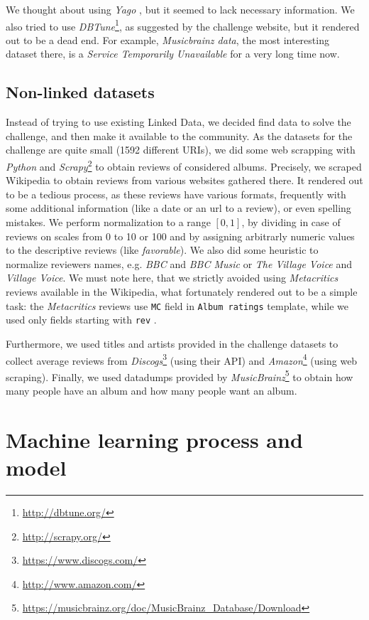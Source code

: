\documentclass{llncs}
\begin{document}
We thought about using \emph{Yago} \cite{yago}, but it seemed to lack necessary information.
We also tried to use \emph{DBTune}\footnote{\url{http://dbtune.org/}}, as suggested by the challenge website, but it rendered out to be a dead end.
For example, \emph{Musicbrainz data}, the most interesting dataset there, is a \emph{Service Temporarily Unavailable} for a very long time now.

\subsection{Non-linked datasets\label{sec:nonld}}
Instead of trying to use existing Linked Data, we decided find data to solve the challenge, and then make it available to the community.
As the datasets for the challenge are quite small (1592 different URIs), we did some web scrapping with \emph{Python} and \emph{Scrapy}\footnote{\url{http://scrapy.org/}} to obtain reviews of considered albums.
Precisely, we scraped Wikipedia to obtain reviews from various websites gathered there.
It rendered out to be a tedious process, as these reviews have various formats, frequently with some additional information (like a date or an url to a review), or even spelling mistakes.
We perform normalization to a range $\left[0,1\right]$, by dividing in case of reviews on scales from 0 to 10 or 100 and by assigning arbitrarly numeric values to the descriptive reviews (like \emph{favorable}).
We also did some heuristic to normalize reviewers names, e.g. \emph{BBC} and \emph{BBC Music} or \emph{The Village Voice} and \emph{Village Voice}.
We must note here, that we strictly avoided using \emph{Metacritics} reviews available in the Wikipedia, what fortunately rendered out to be a simple task: the \emph{Metacritics} reviews use \texttt{MC} field in \texttt{Album ratings} template, while we used only fields starting with \texttt{rev} \cite{album_ratings}.

Furthermore, we used titles and artists provided in the challenge datasets to collect average reviews from \emph{Discogs}\footnote{\url{https://www.discogs.com/}} (using their API) and \emph{Amazon}\footnote{\url{http://www.amazon.com/}} (using web scraping).
Finally, we used datadumps provided by \emph{MusicBrainz}\footnote{\url{https://musicbrainz.org/doc/MusicBrainz_Database/Download}} \cite{musicbrainz} to obtain how many people have an album and how many people want an album.

\section{Machine learning process and model\label{sec:ml}}
\end{document}
